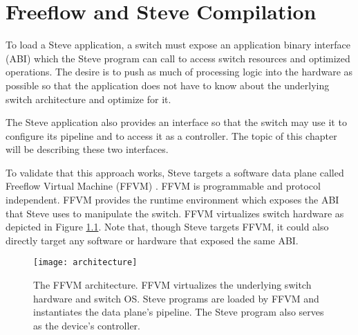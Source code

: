\chapter{Freeflow and Steve Compilation} \label{ch:flowpath}

To load a Steve application, a switch must expose an application binary interface (ABI) which the Steve program can call to access switch resources and optimized operations. The desire is to push as much of processing logic into the hardware as possible 
so that the application does not have to know about the underlying switch architecture and optimize for it.

The Steve application also provides an interface so that the switch may use it to configure its pipeline and to access it as a controller.
The topic of this chapter will be describing these two interfaces.

To validate that this approach works, Steve targets a software data plane called Freeflow Virtual Machine (FFVM) \cite{freeflow_software}. FFVM is programmable and protocol independent. FFVM provides the runtime environment which exposes the ABI that Steve uses to manipulate the switch. FFVM virtualizes switch hardware as depicted in Figure \ref{fig:architecture}. Note that, though Steve targets FFVM, it could also directly target any software or hardware that exposed the same ABI.

%
%

\begin{figure}[ht]
\centering
\texttt{[image: architecture]}
\caption{The FFVM architecture. FFVM virtualizes the underlying switch hardware and switch OS. Steve programs are loaded by FFVM and instantiates the data plane's pipeline. The Steve program also serves as the device's controller.}
\label{fig:architecture}
\end{figure}


